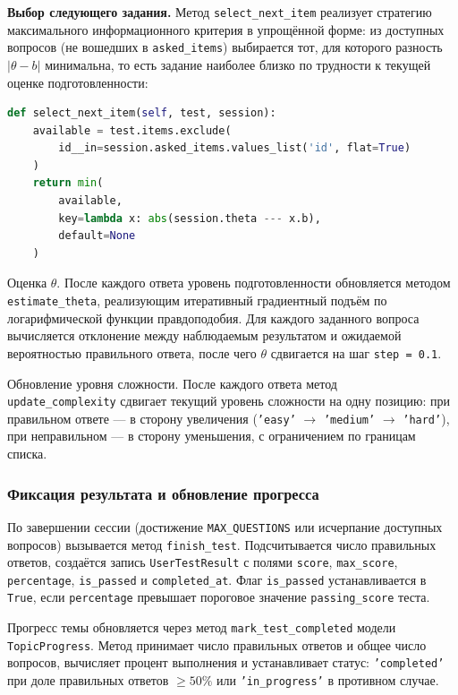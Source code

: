 \textbf{Выбор следующего задания.} Метод \texttt{select\_next\_item} 
реализует стратегию максимального информационного критерия в упрощённой 
форме: из доступных вопросов (не вошедших в \texttt{asked\_items}) 
выбирается тот, для которого разность $|\theta - b|$ минимальна, то есть 
задание наиболее близко по трудности к текущей оценке подготовленности:

\begin{lstlisting}[language=Python, 
    caption={Выбор следующего задания по минимуму $|\theta - b|$},
    basicstyle=\small\ttfamily]
def select_next_item(self, test, session):
    available = test.items.exclude(
        id__in=session.asked_items.values_list('id', flat=True)
    )
    return min(
        available,
        key=lambda x: abs(session.theta --- x.b),
        default=None
    )
\end{lstlisting}

Оценка $\theta$. После каждого ответа уровень подготовленности 
обновляется методом \texttt{estimate\_theta}, реализующим итеративный 
градиентный подъём по логарифмической функции правдоподобия. 
Для каждого заданного вопроса вычисляется отклонение между 
наблюдаемым результатом и ожидаемой вероятностью правильного ответа, 
после чего $\theta$ сдвигается на шаг \texttt{step = 0.1}.

Обновление уровня сложности. После каждого ответа метод\\
\texttt{update\_complexity} сдвигает текущий уровень сложности на 
одну позицию: при правильном ответе --- в сторону увеличения 
(\texttt{'easy'} $\to$ \texttt{'medium'} $\to$ \texttt{'hard'}), 
при неправильном --- в сторону уменьшения, с ограничением по 
границам списка.

\subsubsection{Фиксация результата и обновление прогресса}

По завершении сессии (достижение \texttt{MAX\_QUESTIONS} или 
исчерпание доступных вопросов) вызывается метод \texttt{finish\_test}. 
Подсчитывается число правильных ответов, создаётся запись 
\texttt{UserTestResult} с полями \texttt{score}, \texttt{max\_score}, 
\texttt{percentage}, \texttt{is\_passed} и \texttt{completed\_at}. 
Флаг \texttt{is\_passed} устанавливается в \texttt{True}, если 
\texttt{percentage} превышает пороговое значение \texttt{passing\_score} 
теста.

Прогресс темы обновляется через метод \texttt{mark\_test\_completed} 
модели \texttt{TopicProgress}. Метод принимает число правильных ответов 
и общее число вопросов, вычисляет процент выполнения и устанавливает 
статус: \texttt{'completed'} при доле правильных ответов $\geq 50\%$ 
или \texttt{'in\_progress'} в противном случае.

